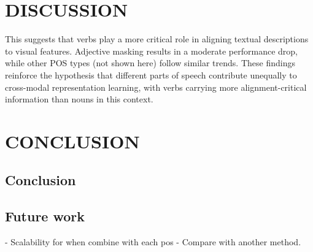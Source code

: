 \chapter{DISCUSSION}
This suggests that verbs play a more critical role in aligning textual descriptions to visual features.
Adjective masking results in a moderate performance drop, while other POS types (not shown here) follow similar trends.
These findings reinforce the hypothesis that different parts of speech contribute unequally to cross-modal representation learning, with verbs carrying more alignment-critical information than nouns in this context.
\chapter{CONCLUSION}
\section{Conclusion}
\section{Future work}
- Scalability for when combine with each pos
- Compare with another method.